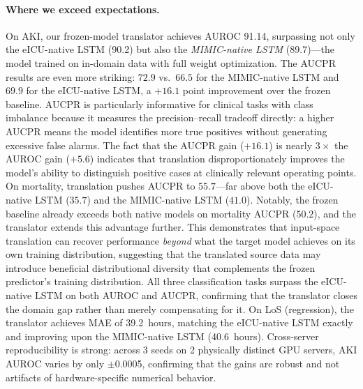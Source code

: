\paragraph{Where we exceed expectations.}
On AKI, our frozen-model translator achieves AUROC 91.14, surpassing not only
the eICU-native LSTM (90.2) but also the \emph{MIMIC-native LSTM} (89.7)---the
model trained on in-domain data with full weight optimization.
The AUCPR results are even more striking: $72.9$ vs.\ $66.5$ for the MIMIC-native LSTM and $69.9$ for the eICU-native LSTM, a $+16.1$ point improvement over the frozen baseline.
AUCPR is particularly informative for clinical tasks with class imbalance because it measures the precision--recall tradeoff directly: a higher AUCPR means the model identifies more true positives without generating excessive false alarms.
The fact that the AUCPR gain ($+16.1$) is nearly $3\times$ the AUROC gain ($+5.6$) indicates that translation disproportionately improves the model's ability to distinguish positive cases at clinically relevant operating points.
On mortality, translation pushes AUCPR to $55.7$---far above both the eICU-native LSTM ($35.7$) and the MIMIC-native LSTM ($41.0$).
Notably, the frozen baseline already exceeds both native models on mortality AUCPR ($50.2$), and the translator extends this advantage further.
This demonstrates that input-space translation can recover performance
\emph{beyond} what the target model achieves on its own training distribution,
suggesting that the translated source data may introduce beneficial distributional
diversity that complements the frozen predictor's training distribution.
All three classification tasks surpass the eICU-native LSTM on both AUROC and AUCPR, confirming that
the translator closes the domain gap rather than merely compensating for it.
On LoS (regression), the translator achieves MAE of 39.2~hours, matching the
eICU-native LSTM exactly and improving upon the MIMIC-native LSTM (40.6~hours).
Cross-server reproducibility is strong: across 3 seeds on 2 physically
distinct GPU servers, AKI AUROC varies by only $\pm$0.0005, confirming that
the gains are robust and not artifacts of hardware-specific numerical behavior.


